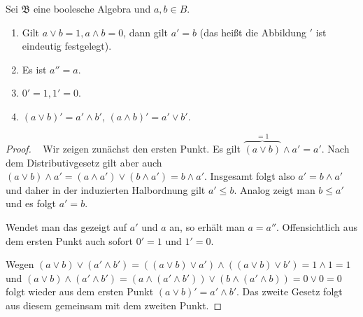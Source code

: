 \begin{lemma}
    Sei $\mathfrak{B}$ eine boolesche Algebra und $a,b \in B$.
    \begin{enumerate}
        \item Gilt $a \lor b = 1, a \land b = 0$, dann gilt $a' = b$ (das heißt die Abbildung $'$ ist eindeutig festgelegt).
        \item Es ist $a'' = a$.
        \item $0' = 1, 1' = 0$.
        \item $(a \lor b)' = a' \land b'$, $(a \land b)' = a' \lor b'$.
    \end{enumerate}
\end{lemma}
\begin{proof}{\ }
    Wir zeigen zunächst den ersten Punkt. Es gilt $\overbrace{(a\lor b)}^{=1}\land a'=a'$. Nach dem Distributivgesetz gilt aber auch $(a\lor b)\land a'=(a\land a')\lor (b\land a')=b\land a'$. Insgesamt folgt also $a'=b\land a'$ und daher in der induzierten Halbordnung gilt $a'\le b$. Analog zeigt man $b\leq a'$ und es folgt $a'=b$.

    Wendet man das gezeigt auf $a'$ und $a$ an, so erhält man $a=a''$. Offensichtlich aus dem ersten Punkt auch sofort $0'=1$ und $1'=0$.

    Wegen $(a\lor b)\lor (a'\land b')=((a\lor b)\lor a') \land ((a\lor b)\lor b')=1\land 1=1$ und $(a\lor b)\land (a'\land b')=(a\land (a'\land b'))\lor (b\land(a'\land b))=0\lor 0=0$ folgt wieder aus dem ersten Punkt $(a\lor b)'=a'\land b'$. Das zweite Gesetz folgt aus diesem gemeinsam mit dem zweiten Punkt.
\end{proof}